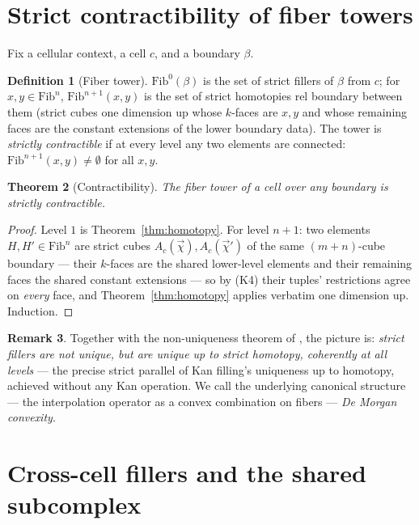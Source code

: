 \documentclass[11pt]{amsart}
\newtheorem{thm}{Theorem}[section]
\theoremstyle{definition}
\newtheorem{defi}[thm]{Definition}
\newtheorem{rem}[thm]{Remark}
\newcommand{\act}[1]{A_{#1}}
\begin{document}
\section{Strict contractibility of fiber towers}
\label{sec:contract}

Fix a cellular context, a cell $c$, and a boundary $\beta$.

\begin{defi}[Fiber tower]\label{def:tower}
  $\mathrm{Fib}^0(\beta)$ is the set of strict fillers of $\beta$
  from $c$; for $x, y \in \mathrm{Fib}^n$,
  $\mathrm{Fib}^{n+1}(x,y)$ is the set of strict homotopies rel
  boundary between them (strict cubes one dimension up whose
  $k$-faces are $x, y$ and whose remaining faces are the constant
  extensions of the lower boundary data).  The tower is
  \emph{strictly contractible} if at every level any two elements
  are connected: $\mathrm{Fib}^{n+1}(x,y) \ne \emptyset$ for all
  $x, y$.
\end{defi}

\begin{thm}[Contractibility]\label{thm:contract}
  The fiber tower of a cell over any boundary is strictly
  contractible.
\end{thm}
\begin{proof}
  Level $1$ is Theorem~\ref{thm:homotopy}.  For level $n+1$: two
  elements $H, H' \in \mathrm{Fib}^n$ are strict cubes
  $\act{c}(\vec\chi), \act{c}(\vec\chi')$ of the same $(m+n)$-cube
  boundary --- their $k$-faces are the shared lower-level elements
  and their remaining faces the shared constant extensions --- so
  by (K4) their tuples' restrictions agree on \emph{every} face,
  and Theorem~\ref{thm:homotopy} applies verbatim one dimension
  up.  Induction.
\end{proof}

\begin{rem}
  Together with the non-uniqueness theorem of \cite{Realization},
  the picture is: \emph{strict fillers are not unique, but are
  unique up to strict homotopy, coherently at all levels} --- the
  precise strict parallel of Kan filling's uniqueness up to
  homotopy, achieved without any Kan operation.  We call the
  underlying canonical structure --- the interpolation operator as
  a convex combination on fibers --- \emph{De Morgan convexity}.
\end{rem}

\section{Cross-cell fillers and the shared subcomplex}
\label{sec:cross}
\end{document}
